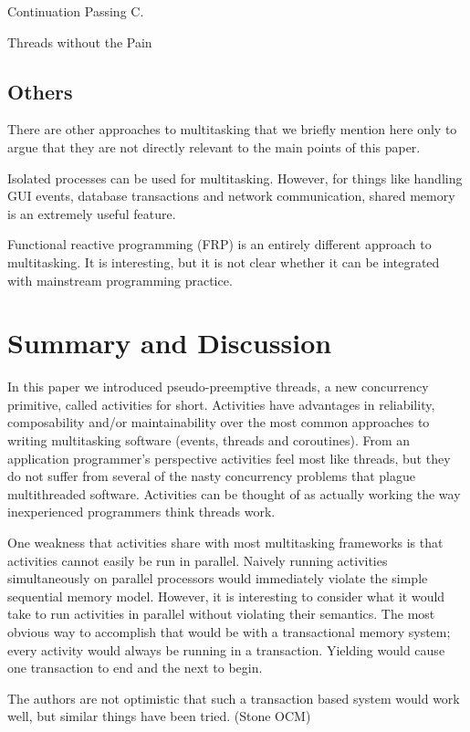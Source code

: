 \documentclass[10pt,preprint]{sigplanconf}
\begin{document}
Continuation Passing C.

Threads without the Pain

\subsection{Others}

There are other approaches to multitasking that we briefly mention here only to argue that they are not directly relevant to the main points of this paper.

Isolated processes can be used for multitasking.
However, for things like handling GUI events, database transactions and network communication, shared memory is an extremely useful feature.

Functional reactive programming (FRP) is an entirely different approach to multitasking.
It is interesting, but it is not clear whether it can be integrated with mainstream programming practice.



\section{Summary and Discussion}

In this paper we introduced pseudo-preemptive threads, a new concurrency primitive, called activities for short.
Activities have advantages in reliability, composability and/or maintainability over the most common approaches to writing multitasking software (events, threads and coroutines).
From an application programmer's perspective activities feel most like threads, but they do not suffer from several of the nasty concurrency problems that plague multithreaded software.
Activities can be thought of as actually working the way inexperienced programmers think threads work.

One weakness that activities share with most multitasking frameworks is that activities cannot easily be run in parallel.
Naively running activities simultaneously on parallel processors would immediately violate the simple sequential memory model.
However, it is interesting to consider what it would take to run activities in parallel without violating their semantics.
The most obvious way to accomplish that would be with a transactional memory system; every activity would always be running in a transaction.
Yielding would cause one transaction to end and the next to begin.

The authors are not optimistic that such a transaction based system would work well, but similar things have been tried. (Stone OCM)
\end{document}
